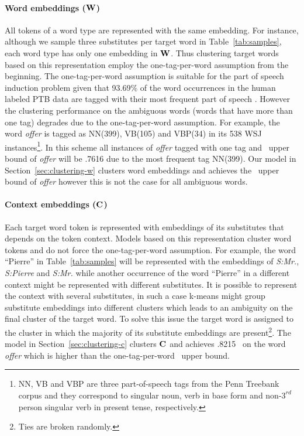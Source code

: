 \paragraph{Word embeddings (${\bf W}$)} All tokens of a word type are
represented with the same embedding.  For instance, although we sample
three substitutes per target word in Table~\ref{tab:samples}, each
word type has only one embedding in ${\bf W}$.  Thus clustering target
words based on this representation employ the one-tag-per-word
assumption from the beginning.  The one-tag-per-word assumption is
suitable for the part of speech induction problem given that 93.69\%
of the word occurrences in the human labeled PTB data are tagged with
their most frequent part of speech
\cite{Toutanova:2003:FPT:1073445.1073478}.  However the clustering
performance on the ambiguous words (words that have more than one tag)
degrades due to the one-tag-per-word assumption.  For example, the
word {\it offer} is tagged as NN(399), VB(105) and VBP(34) in its 538
WSJ instances\footnote{NN, VB and VBP are three part-of-speech tags
  from the Penn Treebank corpus and they correspond to singular noun,
  verb in base form and non-$3^{rd}$person singular verb in present
  tense, respectively.}.  In this scheme all instances of {\it offer}
tagged with one tag and \mto\ upper bound of {\it offer} will be .7616
due to the most frequent tag NN(399). Our model in
Section~\ref{sec:clustering-w} clusters word embeddings and achieves
the \mto\ upper bound of {\it offer} however this is not the case for
all ambiguous words.

\paragraph{Context embeddings (${\bf C}$)} 
Each target word token is represented with embeddings of its
substitutes that depends on the token context.  Models based on this
representation cluster word tokens and do not force the
one-tag-per-word assumption.  For example, the word ``Pierre'' in
Table~\ref{tab:samples} will be represented with the embeddings of
{\it S:Mr.}, {\it S:Pierre} and {\it S:Mr.}  while another occurrence
of the word ``Pierre'' in a different context might be represented
with different substitutes.  It is possible to represent the context
with several substitutes, in such a case k-means might group
substitute embeddings into different clusters which leads to an
ambiguity on the final cluster of the target word.  To solve this
issue the target word is assigned to the cluster in which the majority
of its substitute embeddings are present\footnote{Ties are broken
  randomly.}.  The model in Section~\ref{sec:clustering-c} clusters
${\bf C}$ and achieves .8215 \mto\ on the word {\it offer} which is
higher than the one-tag-per-word \mto\ upper bound.

